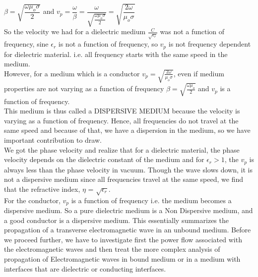 		 $\beta=\sqrt{\dfrac{\omega\mu_{o}\sigma}{2}}$  and   $v_p=\dfrac{\omega}{\beta}=\dfrac{\omega}{\sqrt{\frac{\omega\mu_{o}\sigma}{2}}}=\sqrt{\dfrac{2\omega}{\mu_{o}\sigma}}$\\
		
		So the velocity we had for a dielectric medium $\frac{C}{\sqrt{\epsilon_{r}}}$ was not a function of frequency, sine $\epsilon_{r}$ is not a function of frequency, so $v_p$ is not frequency dependent for dielectric material. i.e. all frequency starts with the same speed in the medium.\\
		However, for a medium which is a conductor $v_p=\sqrt{\frac{2\omega}{\mu_{o}\sigma}}$, even if medium properties are not varying as a function of frequency $\beta=\sqrt{\frac{\omega\mu_{o}}{2}}$ and $v_p$ is a function of frequency.\\
		
		This medium is thus called a DISPERSIVE MEDIUM because the velocity is varying as a function of frequency. Hence, all frequencies do not travel at the same speed and because of that, we have a dispersion in the medium, so we have important contribution to draw.\\
		We got the phase velocity and realize that for a dielectric material, the phase velocity depends on the dielectric constant of the medium and for $\epsilon_{r} > 1$, the $v_p$ is always less than the phase velocity in vacuum. Though the wave slows down, it is not a dispersive medium since all frequencies travel at the same speed, we find that the refractive index, $\eta$ = $\sqrt{\epsilon_{r}}$.\\
		
		For the conductor, $v_p$ is a function of frequency i.e. the medium becomes a dispersive medium. So a pure dielectric medium is a Non Dispersive medium, and a good conductor is a dispersive medium. This essentially summarizes the propagation of a transverse electromagnetic wave in an unbound medium. Before we proceed further, we have to investigate first the power flow associated with the electromagnetic waves and then treat the more complex analysis of propagation of Electromagnetic waves in bound medium or in a medium with interfaces that are dielectric or conducting interfaces.
